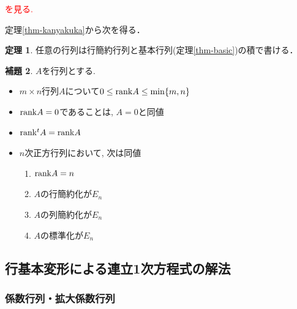 \documentclass[dvipdfmx,a4paper,11pt]{article} %
\newcommand{\xr}[1]{\textcolor{red}{#1}}
\theoremstyle{definition}
\newtheorem{thm}{定理}
\newtheorem{lem}[thm]{補題}
\begin{document}
 \xr{\cite[例 2.3.8]{O}を見る.}
 

定理\ref{thm-kanyakuka}から次を得る．
 \begin{thm}
    任意の行列は行簡約行列と基本行列(定理\ref{thm-basic})の積で書ける．
 \end{thm}
 
 \begin{lem}\cite[注意 2.3.9]{O}
          \label{thm-regular-0}
 $A$を行列とする. 
 \begin{itemize}
 \item $m \times n$行列$A$について$0 \le {\rm rank}A \le \min\{m, n\}$
 \item ${\rm rank} A=0$であることは, $A=0$と同値
 \item ${\rm rank} {}^tA={\rm rank}A$
 \item $n$次正方行列において, 次は同値
 \begin{enumerate}
 \item ${\rm rank}A=n$
 \item $A$の行簡約化が$E_n$
  \item $A$の列簡約化が$E_n$
  \item $A$の標準化が$E_n$
 \end{enumerate}

 \end{itemize}

 \end{lem}


 \subsection{行基本変形による連立1次方程式の解法  \cite[2.4節]{O}}

\subsubsection{係数行列・拡大係数行列}
\end{document}
